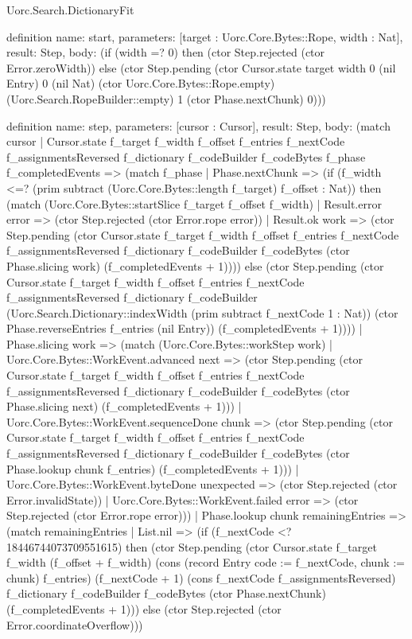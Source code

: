 \begin{lexlean}{Uorc.Search.DictionaryFit}
\begin{semanticmodule}
definition{
  name: start,
  parameters: [target : Uorc.Core.Bytes::Rope, width : Nat],
  result: Step,
  body: (if (width =? 0) then (ctor Step.rejected (ctor Error.zeroWidth)) else (ctor Step.pending (ctor Cursor.state target width 0 (nil Entry) 0 (nil Nat) (ctor Uorc.Core.Bytes::Rope.empty) (Uorc.Search.RopeBuilder::empty) 1 (ctor Phase.nextChunk) 0)))
}

definition{
  name: step,
  parameters: [cursor : Cursor],
  result: Step,
  body: (match cursor
    | Cursor.state f_target f_width f_offset f_entries f_nextCode f_assignmentsReversed f_dictionary f_codeBuilder f_codeBytes f_phase f_completedEvents => (match f_phase
      | Phase.nextChunk => (if (f_width <=? (prim subtract (Uorc.Core.Bytes::length f_target) f_offset : Nat)) then (match (Uorc.Core.Bytes::startSlice f_target f_offset f_width)
        | Result.error error => (ctor Step.rejected (ctor Error.rope error))
        | Result.ok work => (ctor Step.pending (ctor Cursor.state f_target f_width f_offset f_entries f_nextCode f_assignmentsReversed f_dictionary f_codeBuilder f_codeBytes (ctor Phase.slicing work) (f_completedEvents + 1)))) else (ctor Step.pending (ctor Cursor.state f_target f_width f_offset f_entries f_nextCode f_assignmentsReversed f_dictionary f_codeBuilder (Uorc.Search.Dictionary::indexWidth (prim subtract f_nextCode 1 : Nat)) (ctor Phase.reverseEntries f_entries (nil Entry)) (f_completedEvents + 1))))
      | Phase.slicing work => (match (Uorc.Core.Bytes::workStep work)
        | Uorc.Core.Bytes::WorkEvent.advanced next => (ctor Step.pending (ctor Cursor.state f_target f_width f_offset f_entries f_nextCode f_assignmentsReversed f_dictionary f_codeBuilder f_codeBytes (ctor Phase.slicing next) (f_completedEvents + 1)))
        | Uorc.Core.Bytes::WorkEvent.sequenceDone chunk => (ctor Step.pending (ctor Cursor.state f_target f_width f_offset f_entries f_nextCode f_assignmentsReversed f_dictionary f_codeBuilder f_codeBytes (ctor Phase.lookup chunk f_entries) (f_completedEvents + 1)))
        | Uorc.Core.Bytes::WorkEvent.byteDone unexpected => (ctor Step.rejected (ctor Error.invalidState))
        | Uorc.Core.Bytes::WorkEvent.failed error => (ctor Step.rejected (ctor Error.rope error)))
      | Phase.lookup chunk remainingEntries => (match remainingEntries
        | List.nil => (if (f_nextCode <? 18446744073709551615) then (ctor Step.pending (ctor Cursor.state f_target f_width (f_offset + f_width) (cons (record Entry {code := f_nextCode, chunk := chunk}) f_entries) (f_nextCode + 1) (cons f_nextCode f_assignmentsReversed) f_dictionary f_codeBuilder f_codeBytes (ctor Phase.nextChunk) (f_completedEvents + 1))) else (ctor Step.rejected (ctor Error.coordinateOverflow)))
}
\end{semanticmodule}
\end{lexlean}
